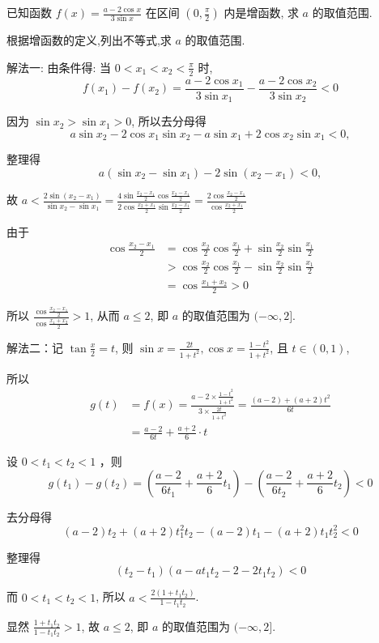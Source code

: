 \begin{example}
	已知函数 $f(x)=\frac{a-2 \cos x}{3 \sin x}$ 在区间 $\left(0, \frac{\pi}{2}\right)$ 内是增函数, 求 $a$ 的取值范围.
\end{example}
\begin{analysis}
	根据增函数的定义,列出不等式,求 $a$ 的取值范围.
\end{analysis}
\begin{solution}
	解法一: 由条件得: 当 $0<x_{1}<x_{2}<\frac{\pi}{2}$ 时,
	$$
		f\left(x_{1}\right)-f\left(x_{2}\right)=\frac{a-2 \cos x_{1}}{3 \sin x_{1}}-\frac{a-2 \cos x_{2}}{3 \sin x_{2}}<0
	$$

	因为 $\sin x_{2}>\sin x_{1}>0$, 所以去分母得
	$$
		a \sin x_{2}-2 \cos x_{1} \sin x_{2}-a \sin x_{1}+2 \cos x_{2} \sin x_{1}<0,
	$$

	整理得
	$$
		a\left(\sin x_{2}-\sin x_{1}\right)-2 \sin \left(x_{2}-x_{1}\right)<0,
	$$

	故
	$a<\frac{2 \sin \left(x_{2}-x_{1}\right)}{\sin x_{2}-\sin x_{1}}=\frac{4 \sin \frac{x_{2}-x_{1}}{2} \cos \frac{x_{2}-x_{1}}{2}}{2 \cos \frac{x_{2}+x_{1}}{2} \sin \frac{x_{2}-x_{1}}{2}}=\frac{2 \cos \frac{x_{2}-x_{1}}{2}}{\cos \frac{x_{2}+x_{1}}{2}}$

	由于
	\begin{align}
		\cos \frac{x_{2}-x_{1}}{2} & =\cos \frac{x_{2}}{2} \cos \frac{x_{1}}{2}+\sin \frac{x_{2}}{2} \sin \frac{x_{1}}{2} \\
		                           & >\cos \frac{x_{2}}{2} \cos \frac{x_{1}}{2}-\sin \frac{x_{2}}{2} \sin \frac{x_{1}}{2} \\
		                           & =\cos \frac{x_{1}+x_{2}}{2}>0
	\end{align}

	所以 $\frac{\cos \frac{x_{2}-x_{1}}{2}}{\cos \frac{x_{1}+x_{2}}{2}}>1$, 从而 $a \leqslant 2$, 即 $a$ 的取值范围为 $(-\infty, 2]$.

	解法二：记 $\tan \frac{x}{2}=t$, 则 $\sin x=\frac{2 t}{1+t^{2}}, \cos x=\frac{1-t^{2}}{1+t^{2}}$, 且 $t \in(0,1)$,

	所以
	$$
		\begin{aligned}
			g(t) & =f(x)=\frac{a-2 \times \frac{1-t^{2}}{1+t^{2}}}{3 \times \frac{2 t}{1+t^{2}}}=\frac{(a-2)+(a+2) t^{2}}{6 t} \\
			     & =\frac{a-2}{6 t}+\frac{a+2}{6} \cdot t
		\end{aligned}
	$$

	设 $0<t_{1}<t_{2}<1$ ，则
	$$
		g\left(t_{1}\right)-g\left(t_{2}\right)=\left(\frac{a-2}{6 t_{1}}+\frac{a+2}{6} t_{1}\right)-\left(\frac{a-2}{6 t_{2}}+\frac{a+2}{6} t_{2}\right)<0
	$$

	去分母得
	$$
		(a-2) t_{2}+(a+2) t_{1}^{2} t_{2}-(a-2) t_{1}-(a+2) t_{1} t_{2}^{2}<0
	$$

	整理得
	$$
		\left(t_{2}-t_{1}\right)\left(a-a t_{1} t_{2}-2-2 t_{1} t_{2}\right)<0
	$$

	而 $0<t_{1}<t_{2}<1$, 所以 $a<\frac{2\left(1+t_{1} t_{2}\right)}{1-t_{1} t_{2}}$.

	显然 $\frac{1+t_{1} t_{2}}{1-t_{1} t_{2}}>1$, 故 $a \leqslant 2$, 即 $a$ 的取值范围为 $(-\infty, 2]$.
\end{solution}
